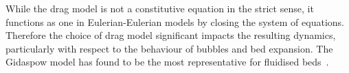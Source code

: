 While the drag model is not a constitutive equation in the strict sense, it functions as one in Eulerian-Eulerian models by closing the system of equations. Therefore the choice of drag model significant impacts the resulting dynamics, particularly with respect to the behaviour of bubbles and bed expansion. The Gidaspow model has found to be the most representative for fluidised beds~\cite{C6RA28615A}.

